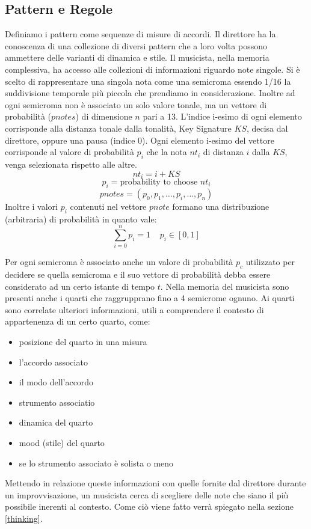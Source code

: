 \subsection{Pattern e Regole}
\label{patterneregole}
Definiamo i pattern come sequenze di misure di accordi. 
Il direttore ha la conoscenza di una collezione di diversi pattern che
a loro volta possono ammettere delle varianti di dinamica e stile.
Il musicista, nella memoria complessiva, ha accesso alle collezioni di
informazioni riguardo note singole. 
Si è scelto di rappresentare una singola nota come una semicroma essendo 
1/16 la suddivisione temporale più piccola che prendiamo in considerazione.
Inoltre ad ogni semicroma non è associato un solo valore tonale, ma un
vettore di probabilità ($pnotes$) di dimensione $n$ pari a 13. L'indice i-esimo
di ogni elemento corrisponde alla distanza tonale dalla tonalità, 
Key Signature $KS$, decisa dal direttore, oppure una pausa (indice 0). 
Ogni elemento i-esimo del vettore 
corrisponde al valore di probabilità $p_i$ che la nota $nt_i$ di distanza 
$i$ dalla $KS$, venga selezionata rispetto alle altre.
\[nt_i = i + KS \]
\[p_i = \text{probability to choose  } nt_i \]
\begin{equation}
\label{eq-pnotes}
pnotes = (p_0, p_1,  \ldots , p_i, \ldots, p_n)
\end{equation}
Inoltre i valori $p_i$ contenuti nel vettore $pnote$ formano una distribuzione 
(arbitraria) di probabilità in quanto vale:
\begin{equation}
\sum_{i=0}^{n} p_i = 1 \;\;\;\; p_i \in [0, 1]
\end{equation}

Per ogni semicroma è associato anche un valore di probabilità $p_c$
utilizzato per decidere se quella semicroma e il suo vettore di
probabilità debba essere considerato ad un certo istante di tempo $t$.
Nella memoria del musicista sono presenti anche i quarti che raggrupprano 
fino a 4 semicrome ognuno. Ai quarti sono correlate ulteriori informazioni, utili
a comprendere il contesto di appartenenza di un certo quarto, come:
\begin{itemize}
\item posizione del quarto in una misura
\item l'accordo associato
\item il modo dell'accordo 
\item strumento associatio
\item dinamica del quarto
\item mood (stile) del quarto
\item se lo strumento associato è solista o meno
\end{itemize}
Mettendo in relazione queste informazioni con quelle fornite dal
direttore durante un improvvisazione, un musicista cerca di 
scegliere delle note che siano il più possibile inerenti al contesto.
Come ciò viene fatto verrà spiegato nella sezione \ref{thinking}.
